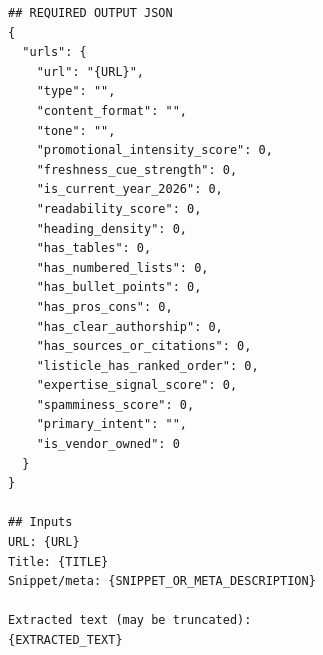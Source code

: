 \begin{lstlisting}
## REQUIRED OUTPUT JSON
{
  "urls": {
    "url": "{URL}",
    "type": "",
    "content_format": "",
    "tone": "",
    "promotional_intensity_score": 0,
    "freshness_cue_strength": 0,
    "is_current_year_2026": 0,
    "readability_score": 0,
    "heading_density": 0,
    "has_tables": 0,
    "has_numbered_lists": 0,
    "has_bullet_points": 0,
    "has_pros_cons": 0,
    "has_clear_authorship": 0,
    "has_sources_or_citations": 0,
    "listicle_has_ranked_order": 0,
    "expertise_signal_score": 0,
    "spamminess_score": 0,
    "primary_intent": "",
    "is_vendor_owned": 0
  }
}

## Inputs
URL: {URL}
Title: {TITLE}
Snippet/meta: {SNIPPET_OR_META_DESCRIPTION}

Extracted text (may be truncated):
{EXTRACTED_TEXT}
\end{lstlisting}
